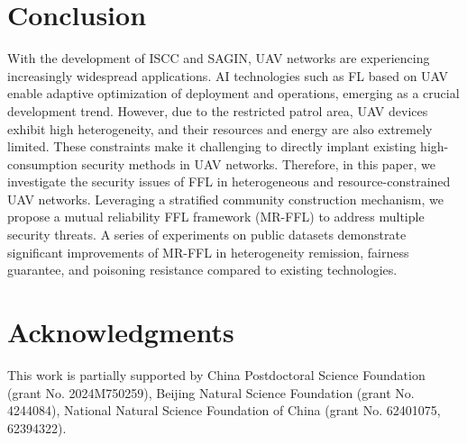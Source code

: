 \documentclass[lettersize,journal]{IEEEtran}
\begin{document}
\section{Conclusion}
With the development of ISCC and SAGIN, UAV networks are experiencing increasingly widespread applications. AI technologies such as FL based on UAV enable adaptive optimization of deployment and operations, emerging as a crucial development trend. However, due to the restricted patrol area, UAV devices exhibit high heterogeneity, and their resources and energy are also extremely limited. These constraints make it challenging to directly implant existing high-consumption security methods in UAV networks. Therefore, in this paper, we investigate the security issues of FFL in heterogeneous and resource-constrained UAV networks. Leveraging a stratified community construction mechanism, we propose a mutual reliability FFL framework (MR-FFL) to address multiple security threats. %
A series of experiments on public datasets demonstrate significant improvements of MR-FFL in heterogeneity remission, fairness guarantee, and poisoning resistance compared to existing technologies.



\section*{Acknowledgments}
This work is partially supported by China Postdoctoral Science Foundation (grant No. 2024M750259), Beijing Natural Science Foundation (grant No. 4244084), National Natural Science Foundation of China (grant No. 62401075, 62394322).





\end{document}
